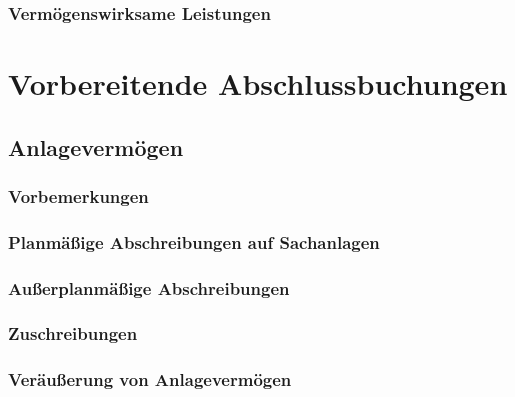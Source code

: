 \documentclass[paper=a4, fontsize=11pt]{scrartcl}
\numberwithin{equation}{section}
\numberwithin{figure}{section}
\numberwithin{table}{section}
\begin{document}

\subsubsection{Vermögenswirksame Leistungen}


\newpage

\section{Vorbereitende Abschlussbuchungen}


\subsection{Anlagevermögen}


\subsubsection{Vorbemerkungen}


\subsubsection{Planmäßige Abschreibungen auf Sachanlagen}


\subsubsection{Außerplanmäßige Abschreibungen}


\subsubsection{Zuschreibungen}


\subsubsection{Veräußerung von Anlagevermögen}
\end{document}
